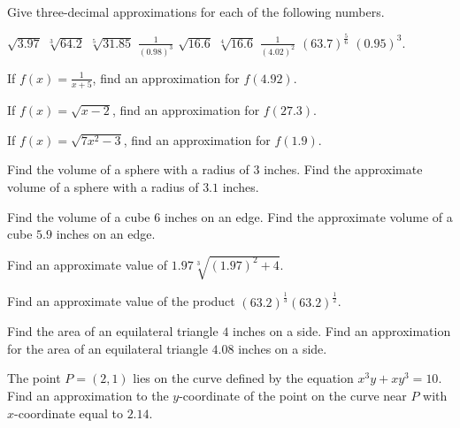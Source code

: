 \begin{exercises}

Give three-decimal approximations for each of the following
numbers.
\begin{exenum}
\sx
$\sqrt{3.97}$
\sx
$\sqrt[3]{64.2}$
\sx
$\sqrt[5]{31.85}$
\sx
$\frac1{(0.98)^3}$
\sx
$\sqrt{16.6}$
\sx
$\sqrt[4]{16.6}$
\sx
$\frac1{(4.02)^2}$
\sx
$(63.7)^\frac56$
\sx
$(0.95)^3$.
\end{exenum}

If $f(x) = \frac1{x+5}$, find an approximation for
$f(4.92)$.

If $f(x) = \sqrt{x-2}$, find an approximation for
$f(27.3)$.

If $f(x) = \sqrt{7x^2 - 3}$, find an approximation for
$f(1.9)$.

\begin{exenum}
\sx
Find the volume of a sphere with a radius of $3$ inches.
\sx
Find the approximate volume of a sphere with a radius of
$3.1$ inches.
\end{exenum}

\begin{exenum}
\sx
Find the volume of a cube $6$ inches on an edge.
\sx
Find the approximate volume of a cube $5.9$ inches
on an edge.
\end{exenum}

Find an approximate value of
$1.97\sqrt[3]{(1.97)^2 + 4}$.

Find an approximate value of the product
$(63.2)^\frac13(63.2)^\frac12$.

\begin{exenum}
\sx
Find the area of an equilateral triangle $4$ inches
on a side.
\sx
Find an approximation for the area of an equilateral
triangle $4.08$ inches on a side.
\end{exenum}

The point $P = (2,1)$ lies on the curve defined by the
equation $x^3y + xy^3 = 10$.  Find an approximation
to the $y$-coordinate of the point on the curve near $P$
with $x$-coordinate equal to $2.14$.

\end{exercises}
